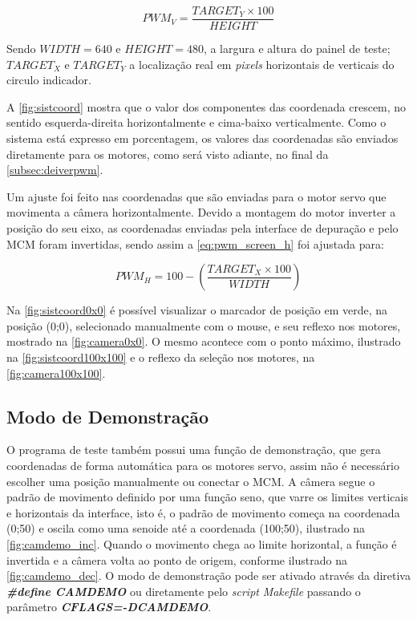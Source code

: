 \begin{equation}
	PWM_V = \frac{TARGET_Y \times 100}{HEIGHT}
	\label{eq:pwm_screen_v}
\end{equation}

Sendo $WIDTH = 640$ e $HEIGHT = 480$, a largura e altura do painel de teste; $TARGET_X$ e $TARGET_Y$ a localização real em \textit{pixels} horizontais de verticais do circulo indicador.

A \autoref{fig:sistcoord} mostra que o valor dos componentes das coordenada crescem, no sentido esquerda-direita horizontalmente e cima-baixo verticalmente. Como o sistema está expresso em porcentagem, os valores das coordenadas são enviados diretamente para os motores, como será visto adiante, no final da \autoref{subsec:deiverpwm}.\par

Um ajuste foi feito nas coordenadas que são enviadas para o motor servo que movimenta a câmera horizontalmente. Devido a montagem do motor inverter a posição do seu eixo, as coordenadas enviadas pela interface de depuração e pelo MCM foram invertidas, sendo assim a \autoref{eq:pwm_screen_h} foi ajustada para:

\begin{equation}
	PWM_H = 100 - (\frac{TARGET_X \times 100}{WIDTH})
	\label{eq:pwm_screen_h_inverse}
\end{equation}

Na \autoref{fig:sistcoord0x0} é possível visualizar o marcador de posição em verde, na posição (0;0), selecionado manualmente com o mouse, e seu reflexo nos motores, mostrado na \autoref{fig:camera0x0}. O mesmo acontece com o ponto máximo, ilustrado na \autoref{fig:sistcoord100x100} e o reflexo da seleção nos motores, na \autoref{fig:camera100x100}.\par

\subsection{Modo de Demonstração}
\label{subsec:camdemo}

O programa de teste também possui uma função de demonstração, que gera coordenadas de forma automática para os motores servo, assim não é necessário escolher uma posição manualmente ou conectar o MCM. A câmera segue o padrão de movimento definido por uma função seno, que varre os limites verticais e horizontais da interface, isto é, o padrão de movimento começa na coordenada (0;50) e oscila como uma senoide até a coordenada (100;50), ilustrado na \autoref{fig:camdemo_inc}. Quando o movimento chega ao limite horizontal, a função é invertida e a câmera volta ao ponto de origem, conforme ilustrado na \autoref{fig:camdemo_dec}. O modo de demonstração pode ser ativado através da diretiva \textit{\textbf{\#define CAMDEMO}} ou diretamente pelo \textit{script} \textit{Makefile} passando o parâmetro \textbf{\textit{CFLAGS=-DCAMDEMO}}.


